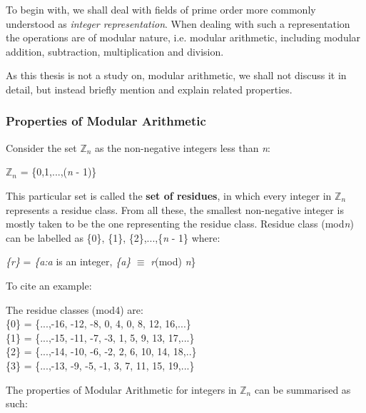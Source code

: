 \documentclass[iwp,first]{luthesis}
\begin{document}
To begin with, we shall deal with fields of prime order more commonly understood as \textit{integer representation}. When dealing with such a representation the operations are of modular nature, i.e. modular arithmetic, including modular addition, subtraction, multiplication and division. 

As this thesis is not a study on, modular arithmetic, we shall not discuss it in detail, but instead briefly mention and explain related properties.

\subsubsection{Properties of Modular Arithmetic}

Consider the set $\mathbb{Z}_n$ as the non-negative integers less than \textit{n}:

\begin{center}
$\mathbb{Z}_n$ = \{0,1,...,(\textit{n} - 1)\}
\end{center}

This particular set is called the \textbf{set of residues}, in which every integer in $\mathbb{Z}_n$ represents a residue class. From all these, the smallest non-negative integer is mostly taken to be the one representing the residue class. Residue class (mod\textit{n}) can be labelled as \{0\}, \{1\}, \{2\},...,\{\textit{n} - 1\} where:

\begin{center}
{\textit{\{r\}}} = {\textit{\{a:a}} is an integer, {\textit{\{a\}}} $\equiv$ \textit{r}(mod) \textit{n}\}
\end{center}

To cite an example:
\begin{center}
The residue classes (mod4) are:
\\
\{0\} = \{...,-16, -12, -8, 0, 4, 0, 8, 12, 16,...\}
\\
\{1\} = \{...,-15, -11, -7, -3, 1, 5, 9, 13, 17,...\}
\\
\{2\} = \{...,-14, -10, -6, -2, 2, 6, 10, 14, 18,..\}
\\
\{3\} = \{...,-13, -9, -5, -1, 3, 7, 11, 15, 19,...\}
\end{center}

The properties of Modular Arithmetic for integers in $\mathbb{Z}_n$ can be summarised as such:
\end{document}
